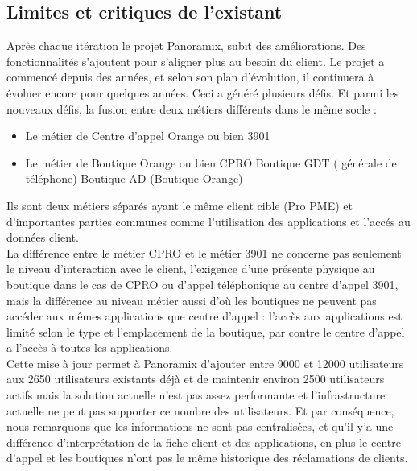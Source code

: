 \subsection[Limites et critiques de l’existant]{Limites et critiques de l’existant}
Après chaque itération le projet Panoramix, subit des améliorations. Des fonctionnalités s’ajoutent pour s’aligner plus au besoin du client. Le projet a commencé depuis des années, et selon son plan d’évolution, il continuera à évoluer encore pour quelques années. Ceci a généré plusieurs défis. Et parmi les nouveaux défis, la fusion entre deux métiers différents dans le  même socle :
\begin{itemize}
	\item Le métier de Centre d’appel Orange ou bien 3901
	\item Le métier de Boutique Orange ou bien CPRO
		\subitem \textbullet Boutique GDT ( générale de téléphone)
		\subitem \textbullet Boutique AD (Boutique Orange)
\end{itemize}
Ils sont deux métiers séparés ayant le même client cible (Pro PME) et d'importantes parties communes comme l'utilisation des applications et l'accés au données client.\\
La différence entre le métier CPRO et le métier 3901 ne concerne pas seulement le niveau d’interaction avec le client, l'exigence d'une présente physique au boutique dans le cas de CPRO ou d'appel téléphonique au centre d'appel 3901, mais la différence au niveau métier aussi d'où les boutiques ne peuvent pas accéder aux mêmes applications que centre d’appel : l’accès aux applications est limité selon le type et l’emplacement de la boutique, par contre le centre d’appel a l’accès à toutes les applications.\\
Cette mise à jour permet à Panoramix d’ajouter entre 9000 et 12000 utilisateurs aux 2650 utilisateurs existants déjà et  de maintenir environ 2500 utilisateurs actifs mais la solution actuelle n’est pas assez performante et l’infrastructure actuelle ne peut pas supporter ce nombre des utilisateurs. Et par conséquence, nous remarquons que les informations ne sont pas centralisées, et qu'il y’a une différence d’interprétation de la fiche client et des applications, en plus le centre d’appel et les boutiques n’ont pas le même historique des réclamations de clients.
